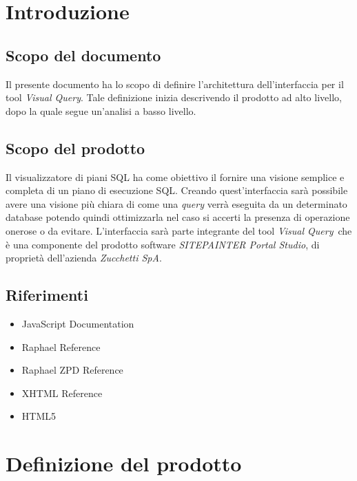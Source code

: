 \section{Introduzione}
\subsection{Scopo del documento}
Il presente documento ha lo scopo di definire l'architettura dell'interfaccia per il tool \textit{Visual Query}. Tale definizione inizia descrivendo il prodotto ad alto livello, dopo la quale segue un'analisi a basso livello.
\subsection{Scopo del prodotto}
Il visualizzatore di piani SQL ha come obiettivo il fornire una visione semplice e completa di un
piano di esecuzione SQL. Creando quest'interfaccia sarà possibile avere una visione più chiara di
come una \textit{query} verrà eseguita da un determinato database potendo quindi ottimizzarla nel caso
si accerti la presenza di operazione onerose o da evitare. L'interfaccia sarà parte integrante del
tool \textit{Visual Query}\ che è una componente del prodotto software \textit{SITEPAINTER Portal Studio}, di proprietà dell'azienda \textit{Zucchetti SpA}.
\subsection{Riferimenti}
\begin{itemize}
\item JavaScript Documentation
\item Raphael Reference
\item Raphael ZPD Reference
\item XHTML Reference
\item HTML5
\end{itemize}
\newpage
\section{Definizione del prodotto}
